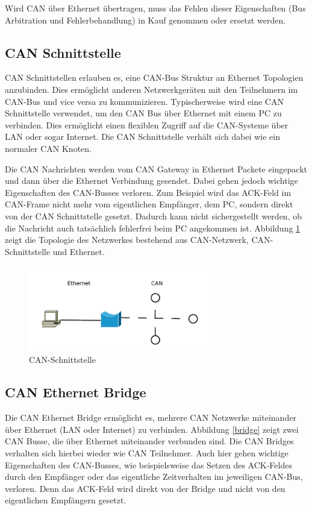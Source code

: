 Wird CAN über Ethernet übertragen, muss das Fehlen dieser Eigenschaften (Bus
Arbitration und Fehlerbehandlung) in Kauf genommen oder ersetzt werden.

\subsection{CAN Schnittstelle}
\label{l:interf}

CAN Schnittstellen erlauben es, eine CAN-Bus Struktur an Ethernet Topologien anzubinden. 
Dies ermöglicht anderen Netzwerkgeräten mit den Teilnehmern im CAN-Bus und vice versa 
zu kommunizieren. Typischerweise wird eine CAN Schnittstelle verwendet, um den CAN Bus 
über Ethernet mit einem PC zu verbinden. Dies ermöglicht einen flexiblen Zugriff auf die 
CAN-Systeme über LAN oder sogar Internet. Die CAN Schnittstelle verhält sich dabei wie 
ein normaler CAN Knoten. \citep{STE}

Die CAN Nachrichten werden vom CAN Gateway in Ethernet Packete eingepackt und dann 
über die Ethernet Verbindung gesendet. Dabei gehen jedoch wichtige Eigenschaften des 
CAN-Busses verloren. Zum Beispiel wird das ACK-Feld im CAN-Frame nicht mehr vom 
eigentlichen Empfänger, dem PC, sondern direkt von der CAN Schnittstelle gesetzt. Dadurch 
kann nicht sichergestellt werden, ob die Nachricht auch tatsächlich fehlerfrei beim PC angekommen ist.
Abbildung \ref{gateway} zeigt die Topologie des Netzwerkes bestehend aus CAN-Netzwerk, 
CAN-Schnittstelle und Ethernet.

\begin{figure}[h] 
\centering
\includegraphics[width=0.7\textwidth]{figures/can_gateway}
\caption{CAN-Schnittstelle} 
\label{gateway}
\end{figure} 

\subsection{CAN Ethernet Bridge}
\label{l:bridge}

Die CAN Ethernet Bridge ermöglicht es, mehrere CAN Netzwerke miteinander über Ethernet 
(LAN oder Internet) zu verbinden. Abbildung \ref{bridge} zeigt zwei CAN Busse, die über 
Ethernet miteinander verbunden sind. Die CAN Bridges verhalten sich hierbei wieder wie 
CAN Teilnehmer. Auch hier gehen wichtige Eigenschaften des CAN-Busses, wie beispielsweise 
das Setzen des ACK-Feldes durch den Empfänger oder das eigentliche Zeitverhalten im 
jeweiligen CAN-Bus, verloren. Denn das ACK-Feld wird direkt von der Bridge und nicht von 
den eigentlichen Empfängern gesetzt.

